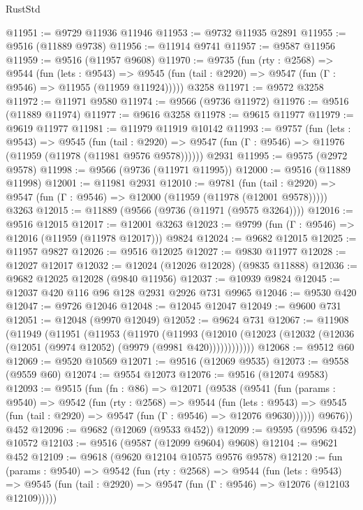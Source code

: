 \begin{lexlean}{RustStd}
\begin{coremodule}
@11951 := @9729 @11936 @11946
@11953 := @9732 @11935 @2891
@11955 := @9516 (@11889 @9738)
@11956 := @11914 @9741
@11957 := @9587 @11956
@11959 := @9516 (@11957 @9608)
@11970 := @9735
    (fun (rty : @2568) =>
    @9544
      (fun (lets : @9543) =>
      @9545 (fun (tail : @2920) => @9547 (fun (Γ : @9546) => @11955 (@11959 @11924)))))
    @3258
@11971 := @9572 @3258
@11972 := @11971 @9580
@11974 := @9566 (@9736 @11972)
@11976 := @9516 (@11889 @11974)
@11977 := @9616 @3258
@11978 := @9615 @11977
@11979 := @9619 @11977
@11981 := @11979 @11919 @10142
@11993 := @9757
    (fun (lets : @9543) =>
    @9545
      (fun (tail : @2920) =>
      @9547 (fun (Γ : @9546) => @11976 (@11959 (@11978 (@11981 @9576 @9578))))))
    @2931
@11995 := @9575 (@2972 @9578)
@11998 := @9566 (@9736 (@11971 @11995))
@12000 := @9516 (@11889 @11998)
@12001 := @11981 @2931
@12010 := @9781
    (fun (tail : @2920) => @9547 (fun (Γ : @9546) => @12000 (@11959 (@11978 (@12001 @9578)))))
    @3263
@12015 := @11889 (@9566 (@9736 (@11971 (@9575 @3264))))
@12016 := @9516 @12015
@12017 := @12001 @3263
@12023 := @9799 (fun (Γ : @9546) => @12016 (@11959 (@11978 @12017))) @9824
@12024 := @9682 @12015
@12025 := @11957 @9827
@12026 := @9516 @12025
@12027 := @9830 @11977
@12028 := @12027 @12017
@12032 := @12024 (@12026 @12028) (@9835 @11888)
@12036 := @9682 @12025 @12028 (@9840 @11956)
@12037 := @10939 @9824
@12045 := @12037 @420 @116 @96 @128 @2931 @2926 @731 @9965
@12046 := @9530 @420
@12047 := @9726 @12046
@12048 := @12045 @12047
@12049 := @9600 @731
@12051 := @12048 (@9970 @12049)
@12052 := @9624 @731
@12067 := @11908
    (@11949
      (@11951
        (@11953
          (@11970
            (@11993
              (@12010 (@12023 (@12032 (@12036 (@12051 (@9974 @12052) (@9979 (@9981 @420))))))))))))
@12068 := @9512 @60
@12069 := @9520 @10569
@12071 := @9516 (@12069 @9535)
@12073 := @9558 (@9559 @60)
@12074 := @9554 @12073
@12076 := @9516 (@12074 @9583)
@12093 := @9515
    (fun (fn : @86) =>
    @12071
      (@9538
        (@9541
          (fun (params : @9540) =>
          @9542
            (fun (rty : @2568) =>
            @9544
              (fun (lets : @9543) =>
              @9545 (fun (tail : @2920) => @9547 (fun (Γ : @9546) => @12076 @9630))))))
        @9676))
    @452
@12096 := @9682 (@12069 (@9533 @452))
@12099 := @9595 (@9596 @452) @10572
@12103 := @9516 (@9587 (@12099 @9604) @9608)
@12104 := @9621 @452
@12109 := @9618 (@9620 @12104 @10575 @9576 @9578)
@12120 := fun (params : @9540) =>
  @9542
    (fun (rty : @2568) =>
    @9544
      (fun (lets : @9543) =>
      @9545 (fun (tail : @2920) => @9547 (fun (Γ : @9546) => @12076 (@12103 @12109)))))

\end{coremodule}
\end{lexlean}
